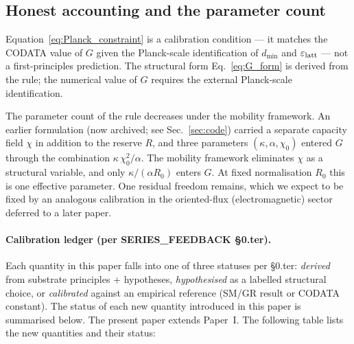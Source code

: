 \documentclass[11pt,a4paper]{article}
\begin{document}
\subsection{Honest accounting and the parameter count}

Equation~\eqref{eq:Planck_constraint} is a calibration
condition --- it matches the CODATA value of $G$ given the
Planck-scale identification of $d_{\min}$ and
$\varepsilon_{\rm latt}$ --- not a first-principles
prediction. The structural form Eq.~\eqref{eq:G_form} is
derived from the rule; the numerical value of $G$ requires the
external Planck-scale identification.

The parameter count of the rule decreases under the mobility
framework. An earlier formulation (now archived; see
Sec.~\ref{sec:code}) carried a separate capacity field $\chi$
in addition to the reserve $R$, and three parameters
$(\kappa, \alpha, \chi_0)$ entered $G$ through the combination
$\kappa\, \chi_0^2 / \alpha$. The mobility framework
eliminates $\chi$ as a structural variable, and only $\kappa /
(\alpha R_0)$ enters $G$. At fixed normalisation $R_0$ this is
one effective parameter. One residual freedom remains, which
we expect to be fixed by an analogous calibration in the
oriented-flux (electromagnetic) sector deferred to a later
paper.

\paragraph{Calibration ledger (per SERIES\_FEEDBACK §0.ter).}
Each quantity in this paper falls into one of three statuses
per §0.ter: \emph{derived} from substrate principles +
hypotheses, \emph{hypothesised} as a labelled structural choice,
or \emph{calibrated} against an empirical reference (SM/GR
result or CODATA constant). The status of each new quantity
introduced in this paper is summarised below.
The present paper extends Paper~I. The following table lists
the new quantities and their status:
\end{document}
